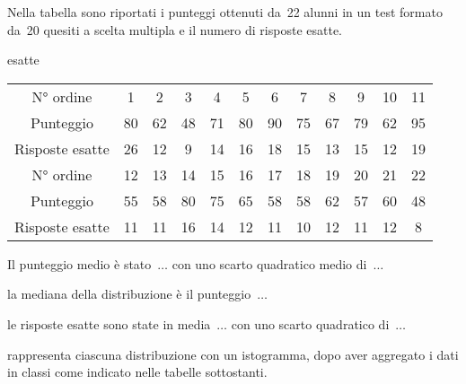 \begin{esercizio}
\label{ese:A.45}
Nella tabella sono riportati i punteggi ottenuti da~22 alunni in un test 
formato da~20 quesiti a scelta multipla e il numero di risposte esatte.
\begin{center}
esatte\\
\begin{tabular}{cccccccccccc}
\toprule
N° ordine & 1 & 2 & 3 & 4 & 5 & 6 & 7 & 8 & 9 & 10 & 11 \\
Punteggio & 80 & 62 & 48 & 71 & 80 & 90 & 75 & 67 & 79 & 62 & 95 \\
Risposte esatte & 26 & 12 & 9 & 14 & 16 & 18 & 15 & 13 & 15 & 12 & 19 \\
\midrule
N° ordine & 12 & 13 & 14 & 15 & 16 & 17 & 18 & 19 & 20 & 21 & 22 \\
Punteggio & 55 & 58 & 80 & 75 & 65 & 58 & 58 & 62 & 57 & 60 & 48 \\
Risposte esatte & 11 & 11 & 16 & 14 & 12 & 11 & 10 & 12 & 11 & 12 & 8 \\
\bottomrule
\end{tabular}
\end{center}
\begin{enumeratea}
 \item Il punteggio medio è stato~$\dots$ con uno scarto quadratico medio 
di~$\dots$
 \item la mediana della distribuzione è il punteggio~$\dots$
 \item le risposte esatte sono state in media~$\dots$ con uno scarto 
quadratico di~$\dots$
 \item rappresenta ciascuna distribuzione con un istogramma, dopo aver 
aggregato i dati in classi come indicato nelle tabelle sottostanti.
\end{enumeratea}


\end{esercizio}
